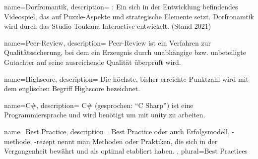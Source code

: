 {
	name=Dorfromantik,
	description={
		\cite{DorfromantikHomepage}: Ein sich in der Entwicklung befindendes Videospiel, das auf Puzzle-Aspekte und strategische Elemente setzt. Dorfronamtik wird durch das Studio Toukana Interactive entwickelt. (Stand 2021)
	}
}

{
	name=Peer-Review,
	description={
		Peer-Review ist ein Verfahren zur Qualitätssicherung, bei dem ein Erzeugnis durch unabhängige bzw. unbeteiligte Gutachter auf seine ausreichende Qualität überprüft wird.
	}
}

{
	name=Highscore,
	description={
		Die höchste, bisher erreichte Punktzahl wird mit dem englischen Begriff Highscore bezeichnet.
	}
}

{
	name=C\#,
	description={
		C\# (gesprochen: \enquote{C Sharp}) ist eine Programmiersprache und wird benötigt um mit \gls{unity} zu arbeiten.
	}
}

{
	name=Best Practice,
	description={
		Best Practice oder auch Erfolgsmodell, -methode, -rezept nennt man Methoden oder Praktiken, die sich in der Vergangenheit bewährt und als optimal etabliert haben.
	},
	plural={Best Practices}
}

